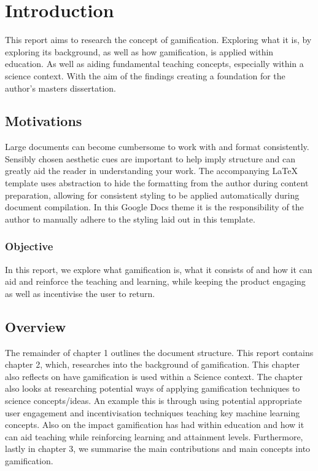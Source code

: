 \chapter{Introduction}
	\label{chap:intro}
	
	This report aims to research the concept of gamification. Exploring what it is, by exploring its background, as well as how gamification, is applied within education. As well as aiding fundamental teaching concepts, especially within a science context. With the aim of the findings creating a foundation for the author's masters dissertation. 
	
	\section{Motivations}
		\label{sec:intro_motivation} 
		
		Large documents can become cumbersome to work with and format consistently. Sensibly chosen aesthetic cues are important to help imply structure and can greatly aid the reader in understanding your work. The accompanying LaTeX template uses abstraction to hide the formatting from the author during content preparation, allowing for consistent styling to be applied automatically during document compilation. In this Google Docs theme it is the responsibility of the author to manually adhere to the styling laid out in this template.
	
	\subsection{Objective}
		\label{sec:intro_objective} 
		
		In this report, we explore what gamification is, what it consists of and how it can aid and reinforce the teaching and learning, while keeping the product engaging as well as incentivise the user to return. 
		
	\section{Overview}  
		\label{sec:intro_overview} 
		
		The remainder of chapter 1 outlines the document structure. This report contains chapter 2, which, researches into the background of gamification. This chapter also reflects on have gamification is used within a Science context. The chapter also looks at researching potential ways of applying gamification techniques to science concepts/ideas. An example this is through using potential appropriate user engagement and incentivisation techniques teaching key machine learning concepts. Also on the impact gamification has had within education and how it can aid teaching while reinforcing learning and attainment levels. Furthermore, lastly in chapter 3, we summarise the main contributions and main concepts into gamification.
	
